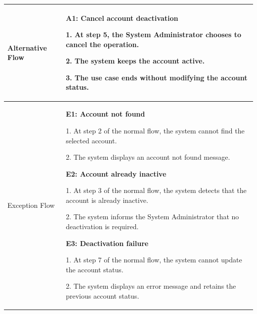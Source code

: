 \begin{longtable}{|>{\bfseries\raggedright\arraybackslash}p{}|>{\raggedright\arraybackslash}p{}|}
Alternative Flow &
\textbf{A1: Cancel account deactivation} \par
1. At step 5, the System Administrator chooses to cancel the operation. \par
2. The system keeps the account active. \par
3. The use case ends without modifying the account status. \\ \hline
Exception Flow &
\textbf{E1: Account not found} \par
1. At step 2 of the normal flow, the system cannot find the selected account. \par
2. The system displays an account not found message. \par\vspace{4pt}
\textbf{E2: Account already inactive} \par
1. At step 3 of the normal flow, the system detects that the account is already inactive. \par
2. The system informs the System Administrator that no deactivation is required. \par\vspace{4pt}
\textbf{E3: Deactivation failure} \par
1. At step 7 of the normal flow, the system cannot update the account status. \par
2. The system displays an error message and retains the previous account status. \\ \hline
\end{longtable}


